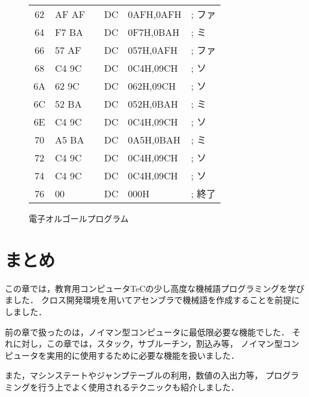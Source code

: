 \begin{figure}[btp]
{\begin{center}
\begin{tabular}{|c|l|l|l l l|}
62 & AF AF        &         & DC     & 0AFH,0AFH   &   ; ファ\\
64 & F7 BA        &         & DC     & 0F7H,0BAH   &   ; ミ\\
66 & 57 AF        &         & DC     & 057H,0AFH   &   ; ファ\\
68 & C4 9C        &         & DC     & 0C4H,09CH   &   ; ソ\\
6A & 62 9C        &         & DC     & 062H,09CH   &   ; ソ\\
6C & 52 BA        &         & DC     & 052H,0BAH   &   ; ミ\\
6E & C4 9C        &         & DC     & 0C4H,09CH   &   ; ソ\\
70 & A5 BA        &         & DC     & 0A5H,0BAH   &   ; ミ\\
72 & C4 9C        &         & DC     & 0C4H,09CH   &   ; ソ\\
74 & C4 9C        &         & DC     & 0C4H,09CH   &   ; ソ\\
76 & 00           &         & DC     & 000H        &   ; 終了\\
\hline
\end{tabular}
\end{center}}
\caption{電子オルゴールプログラム}
\label{fig:chap6:doremi}
\end{figure}

\newpage
\section{まとめ}

この章では，教育用コンピュータTeCの少し高度な機械語プログラミングを学びました．
クロス開発環境を用いてアセンブラで機械語を作成することを前提にしました．

前の章で扱ったのは，ノイマン型コンピュータに最低限必要な機能でした．
それに対し，この章では，スタック，サブルーチン，割込み等，
ノイマン型コンピュータを実用的に使用するために必要な機能を扱いました．

また，マシンステートやジャンプテーブルの利用，数値の入出力等，
プログラミングを行う上でよく使用されるテクニックも紹介しました．
